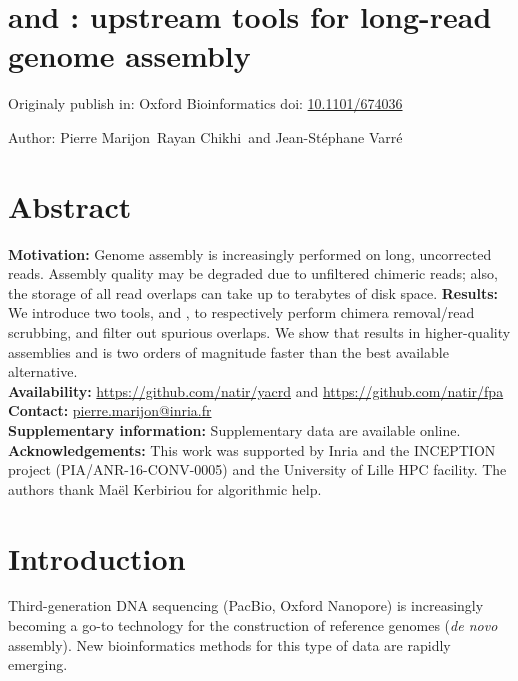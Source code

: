 \documentclass[./main.tex]{subfiles}
\begin{document}
\section{\yacrd and \fpa: upstream tools for long-read genome assembly}

Originaly publish in: Oxford Bioinformatics doi: \href{https://doi.org/10.1101/674036}{10.1101/674036}

Author: Pierre Marijon\, Rayan Chikhi\, and Jean-St\'ephane Varr\'e\


\section{Abstract}

\textbf{Motivation:} Genome assembly is increasingly performed on long, uncorrected reads. Assembly quality may be degraded due to unfiltered chimeric reads; also, the storage of all read overlaps can take up to terabytes of disk space. 
\textbf{Results:} We introduce two tools, \yacrd and \fpa, to respectively perform chimera removal/read scrubbing, and filter out spurious overlaps. We show that \yacrd results in higher-quality assemblies and is two orders of magnitude faster than the best available alternative.\\
\textbf{Availability:} \url{https://github.com/natir/yacrd} and \url{https://github.com/natir/fpa} \\
\textbf{Contact:} \href{pierre.marijon@inria.fr}{pierre.marijon@inria.fr}\\
\textbf{Supplementary information:} Supplementary data are available online.\\
\textbf{Acknowledgements:}
This work was supported by Inria and the INCEPTION project (PIA/ANR-16-CONV-0005) and the University of Lille HPC facility. The authors thank Maël Kerbiriou for algorithmic help.




\section{Introduction}

Third-generation DNA sequencing (PacBio, Oxford Nanopore) is increasingly becoming a go-to technology for the construction of reference genomes (\emph{de novo} assembly). New bioinformatics methods for this type of data are rapidly emerging.

\end{document}
